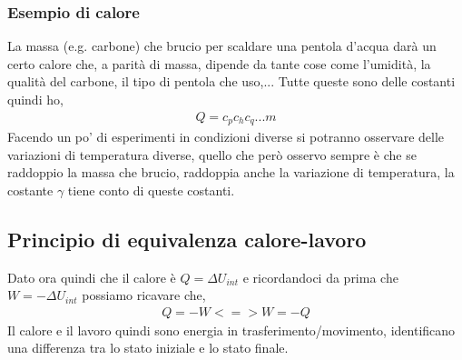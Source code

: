         \subsubsection{Esempio di calore}
            La massa (e.g. carbone) che brucio per scaldare una pentola d'acqua darà un certo calore che, a parità di massa, dipende da tante cose come l'umidità, la qualità del carbone, il tipo di pentola che uso,... Tutte queste sono delle costanti quindi ho,
            \begin{align*}
                Q = c_p c_h c_q ... m
            \end{align*}
            Facendo un po' di esperimenti in condizioni diverse si potranno osservare delle variazioni di temperatura diverse, quello che però osservo sempre è che se raddoppio la massa che brucio, raddoppia anche la variazione di temperatura, la costante $\gamma$ tiene conto di queste costanti.

    \subsection{Principio di equivalenza calore-lavoro}
        Dato ora quindi che il calore è $Q = \Delta U_{int}$ e ricordandoci da prima che $W=-\Delta U_{int}$ possiamo ricavare che,
        \begin{align*}
            Q = -W <=> W = -Q
        \end{align*}
        Il calore e il lavoro quindi sono energia in trasferimento/movimento, identificano una differenza tra lo stato iniziale e lo stato finale.

